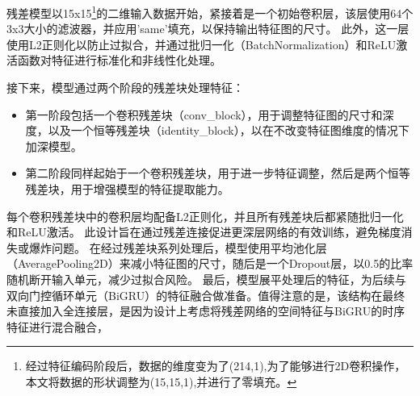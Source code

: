 残差模型以15x15\footnote{经过特征编码阶段后，数据的维度变为了(214,1),为了能够进行2D卷积操作，本文将数据的形状调整为(15,15,1),并进行了零填充。}的二维输入数据开始，紧接着是一个初始卷积层，该层使用64个3x3大小的滤波器，并应用’same’填充，以保持输出特征图的尺寸。
此外，这一层使用L2正则化以防止过拟合，并通过批归一化（BatchNormalization）和ReLU激活函数对特征进行标准化和非线性化处理。

接下来，模型通过两个阶段的残差块处理特征：

\begin{itemize}
  \item 第一阶段包括一个卷积残差块（conv\_block），用于调整特征图的尺寸和深度，以及一个恒等残差块（identity\_block），以在不改变特征图维度的情况下加深模型。
  \item 第二阶段同样起始于一个卷积残差块，用于进一步特征调整，然后是两个恒等残差块，用于增强模型的特征提取能力。
\end{itemize}

每个卷积残差块中的卷积层均配备L2正则化，并且所有残差块后都紧随批归一化和ReLU激活。
此设计旨在通过残差连接促进更深层网络的有效训练，避免梯度消失或爆炸问题。
在经过残差块系列处理后，模型使用平均池化层（AveragePooling2D）来减小特征图的尺寸，随后是一个Dropout层，以0.5的比率随机断开输入单元，减少过拟合风险。
最后，模型展平处理后的特征，为后续与双向门控循环单元（BiGRU）的特征融合做准备。值得注意的是，该结构在最终未直接加入全连接层，是因为设计上考虑将残差网络的空间特征与BiGRU的时序特征进行混合融合，


